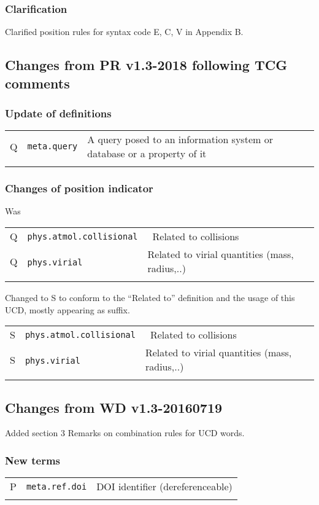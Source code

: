 \documentclass[11pt,a4paper]{ivoa}
\begin{document}
\subsubsection*{Clarification}
Clarified position rules for syntax code E, C, V in Appendix B.  

\subsection{Changes from PR v1.3-2018 following TCG comments}
\subsubsection*{Update of definitions} 
\footnotesize\begin{longtable}[h!]{c|p{39.5ex}|D{0.45\textwidth}}
\sptablerule
Q & {\tt meta.query} &  A query posed to an information system or database or a property of it\\
\sptablerule
\end{longtable}

\subsubsection*{Changes of position indicator} 
Was
\footnotesize\begin{longtable}[h!]{c|p{39.5ex}|D{0.45\textwidth}}
\sptablerule
Q & {\tt phys.atmol.collisional} & Related to collisions\\
Q & {\tt phys.virial}            & Related to virial quantities (mass, radius,..)\\
\sptablerule
\end{longtable}
Changed to S to conform to the “Related to” definition and the usage of this UCD, mostly appearing as suffix.  
\footnotesize\begin{longtable}[h!]{c|p{39.5ex}|D{0.45\textwidth}}
\sptablerule
S & {\tt phys.atmol.collisional} & Related to collisions\\
S & {\tt phys.virial}            & Related to virial quantities (mass, radius,..)\\
\sptablerule
\end{longtable}

\subsection{Changes from WD v1.3-20160719}
Added section 3 Remarks on combination rules for UCD words.

\subsubsection*{New terms}
\footnotesize\begin{longtable}[h!]{c|p{39.5ex}|D{0.45\textwidth}}
\sptablerule
P & {\tt meta.ref.doi} & DOI identifier (dereferenceable)\\
\sptablerule
\end{longtable}
\end{document}
